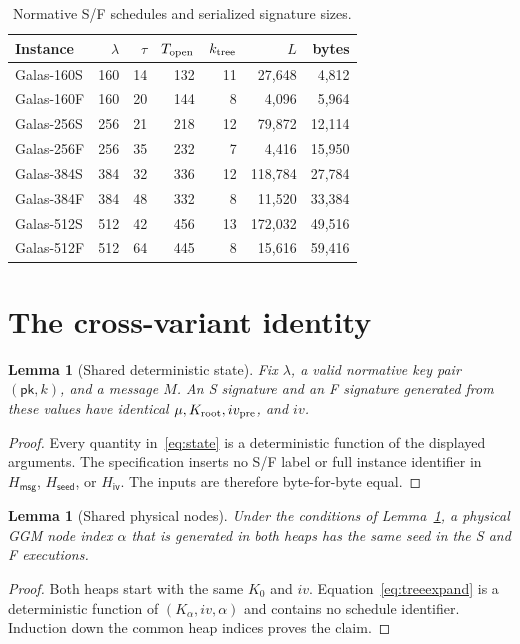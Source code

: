 \documentclass[11pt,a4paper]{article}
\newtheorem{lemma}[theorem]{Lemma}
\newcommand{\pk}{\mathsf{pk}}
\newcommand{\Hmsg}{H_{\mathsf{msg}}}
\newcommand{\Hseed}{H_{\mathsf{seed}}}
\newcommand{\Hiv}{H_{\mathsf{iv}}}
\begin{document}
\begin{table}[t]
\centering
\caption{Normative S/F schedules and serialized signature sizes.}
\label{tab:params}
\begin{tabular}{lrrrrrr}
\toprule
Instance & $\lambda$ & $\tau$ & $T_{\rm open}$ & $k_{\rm tree}$ & $L$ & bytes\\
\midrule
Galas-160S & 160 & 14 & 132 & 11 & 27,648 & 4,812\\
Galas-160F & 160 & 20 & 144 &  8 &  4,096 & 5,964\\
Galas-256S & 256 & 21 & 218 & 12 & 79,872 & 12,114\\
Galas-256F & 256 & 35 & 232 &  7 &  4,416 & 15,950\\
Galas-384S & 384 & 32 & 336 & 12 &118,784 & 27,784\\
Galas-384F & 384 & 48 & 332 &  8 & 11,520 & 33,384\\
Galas-512S & 512 & 42 & 456 & 13 &172,032 & 49,516\\
Galas-512F & 512 & 64 & 445 &  8 & 15,616 & 59,416\\
\bottomrule
\end{tabular}
\end{table}

\section{The cross-variant identity}

\begin{lemma}[Shared deterministic state]\label{lem:state}
Fix $\lambda$, a valid normative key pair $(\pk,k)$, and a message $M$.  An S
signature and an F signature generated from these values have identical
$\mu,K_{\rm root},iv_{\rm pre}$, and $iv$.
\end{lemma}
\begin{proof}
Every quantity in~\eqref{eq:state} is a deterministic function of the displayed
arguments.  The specification inserts no S/F label or full instance identifier
in $\Hmsg$, $\Hseed$, or $\Hiv$.  The inputs are therefore byte-for-byte equal.
\end{proof}

\begin{lemma}[Shared physical nodes]\label{lem:nodes}
Under the conditions of Lemma~\ref{lem:state}, a physical GGM node index
$\alpha$ that is generated in both heaps has the same seed in the S and F
executions.
\end{lemma}
\begin{proof}
Both heaps start with the same $K_0$ and $iv$.  Equation~\eqref{eq:treeexpand}
is a deterministic function of $(K_\alpha,iv,\alpha)$ and contains no schedule
identifier.  Induction down the common heap indices proves the claim.
\end{proof}
\end{document}
